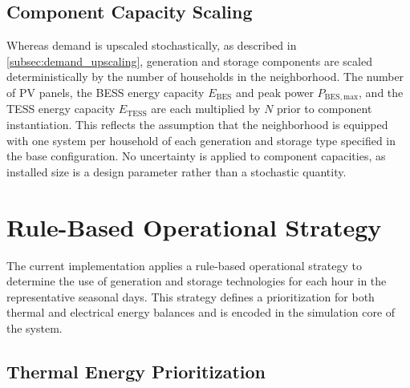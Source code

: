 \documentclass[12pt,a4paper]{report}
\begin{document}
\subsection{Component Capacity Scaling}
\label{subsec:component_scaling}

Whereas demand is upscaled stochastically, as described in \ref{subsec:demand_upscaling}, generation and storage components are scaled deterministically by the number of households in the neighborhood. The number of PV panels, the BESS energy capacity $E_{\mathrm{BES}}$ and peak power $P_{\mathrm{BES,max}}$, and the TESS energy capacity $E_{\mathrm{TESS}}$ are each multiplied by $N$ prior to component instantiation. This reflects the assumption that the neighborhood is equipped with one system per household of each generation and storage type specified in the base configuration. No uncertainty is applied to component capacities, as installed size is a design parameter rather than a stochastic quantity.


\section{Rule-Based Operational Strategy}
\label{sec:rule_based_strategy}

The current implementation applies a rule-based operational strategy to determine the use of generation and storage technologies for each hour in the representative seasonal days. This strategy defines a prioritization for both thermal and electrical energy balances and is encoded in the simulation core of the system.

\subsection{Thermal Energy Prioritization}
\label{subsec:thermal_prioritisation}
\end{document}
